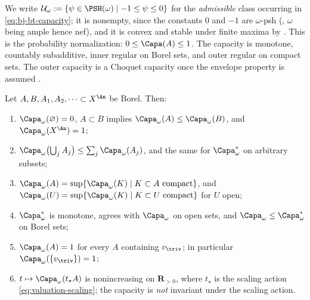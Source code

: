 We write $\mathcal U_\omega:=\{\psi\in\PSH(\omega)\mid-1\le\psi\le0\}$ for the
\emph{admissible} class occurring in \eqref{eq:bj-bt-capacity}; it is
nonempty, since the constants $0$ and $-1$ are $\omega$-psh
(, $\omega$ being ample hence nef), and it is
convex and stable under finite maxima by
.  This is the probability normalization:
$0\leq\Capa(A)\leq1$.  The
capacity is monotone, countably subadditive, inner regular on Borel sets,
and outer regular on compact sets.  The outer capacity is a Choquet
capacity once the envelope property is assumed
\cite[Propositions~13.3--13.4, Corollary~13.13, and Theorem~13.29]{BJ22}.

\begin{proposition}
\label{prop:ch48-capacity-elementary}
Let $A,B,A_1,A_2,\dots\subset X^{\An}$ be Borel.  Then:
\begin{enumerate}
\item\label{itm:ch48-cap:mono}
      $\Capa_\omega(\varnothing)=0$, $A\subset B$ implies
      $\Capa_\omega(A)\le\Capa_\omega(B)$, and
      $\Capa_\omega(X^{\An})=1$;
\item\label{itm:ch48-cap:sub}
      $\Capa_\omega\bigl(\bigcup_jA_j\bigr)\le\sum_j\Capa_\omega(A_j)$,
      and the same for $\Capa^*_\omega$ on arbitrary subsets;
\item\label{itm:ch48-cap:inner}
      $\Capa_\omega(A)=\sup\{\Capa_\omega(K)\mid K\subset A\ \text{compact}\}$,
      and $\Capa_\omega(U)=\sup\{\Capa_\omega(K)\mid K\subset U\
      \text{compact}\}$ for $U$ open;
\item\label{itm:ch48-cap:outer}
      $\Capa^*_\omega$ is monotone, agrees with $\Capa_\omega$ on open
      sets, and $\Capa_\omega\le\Capa^*_\omega$ on Borel sets;
\item\label{itm:ch48-cap:triv}
      $\Capa_\omega(A)=1$ for every $A$ containing $v_{\triv}$; in
      particular $\Capa_\omega(\{v_{\triv}\})=1$;
\item\label{itm:ch48-cap:scaling}
      $t\mapsto\Capa_\omega(t_\star A)$ is nonincreasing on
      $\mathbf R_{>0}$, where $t_\star$ is the scaling action
      \eqref{eq:valuation-scaling}; the capacity is \emph{not} invariant
      under the scaling action.
\end{enumerate}
\end{proposition}

